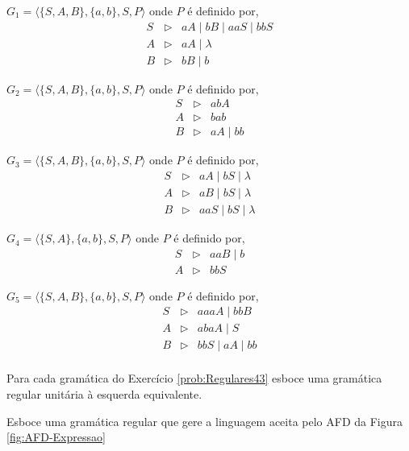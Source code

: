 \begin{exerList}
	\item $G_1 = \langle \{S, A, B\},\{a, b\}, S, P \rangle$ onde $P$ é definido por, 
	\begin{eqnarray*}
		S & \rhd & aA \mid bB \mid aaS \mid bbS\\
		A & \rhd & aA \mid \lambda \\
		B & \rhd & bB \mid b
	\end{eqnarray*}
	\item $G_2 = \langle \{S, A, B\},\{a, b\}, S, P \rangle$ onde $P$ é definido por, 
	\begin{eqnarray*}
		S & \rhd & abA\\
		A & \rhd & bab\\
		B & \rhd & aA \mid bb
	\end{eqnarray*}
	
	\item $G_3 = \langle \{S, A, B\},\{a, b\}, S, P \rangle$ onde $P$ é definido por, 
	\begin{eqnarray*}
		S & \rhd & aA \mid bS \mid \lambda\\
		A & \rhd & aB \mid bS \mid \lambda \\
		B & \rhd & aaS \mid bS \mid \lambda 
	\end{eqnarray*}
	
	\item $G_4 = \langle \{S, A\},\{a, b\}, S, P \rangle$ onde $P$ é definido por,
	\begin{eqnarray*}
		S & \rhd & aaB \mid b\\
		A & \rhd & bbS 
	\end{eqnarray*}
	
	\item $G_5 = \langle \{S, A, B\},\{a, b\}, S, P \rangle$ onde $P$ é definido por, 
	\begin{eqnarray*}
		S & \rhd & aaaA \mid bbB\\
		A & \rhd & abaA \mid S\\
		B & \rhd & bbS \mid aA \mid bb\\ 
	\end{eqnarray*}
\end{exerList}

\begin{problem}\label{prob:Regulares44} 
	Para cada gramática do Exercício \ref{prob:Regulares43} esboce uma gramática regular unitária à esquerda equivalente.
\end{problem}

\begin{problem}\label{prob:Regulares45} 
	Esboce uma gramática regular que gere a linguagem aceita pelo AFD da Figura \ref{fig:AFD-Expressao}
\end{problem}
